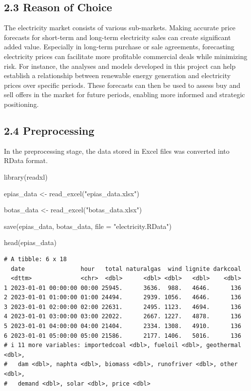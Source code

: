 \documentclass[
]{article}
\newenvironment{Shaded}{\begin{snugshade}}{\end{snugshade}}
\newcommand{\AttributeTok}[1]{\textcolor[rgb]{0.40,0.45,0.13}{#1}}
\newcommand{\FunctionTok}[1]{\textcolor[rgb]{0.28,0.35,0.67}{#1}}
\newcommand{\NormalTok}[1]{\textcolor[rgb]{0.00,0.23,0.31}{#1}}
\newcommand{\OtherTok}[1]{\textcolor[rgb]{0.00,0.23,0.31}{#1}}
\newcommand{\StringTok}[1]{\textcolor[rgb]{0.13,0.47,0.30}{#1}}
\begin{document}
\subsection{2.3 Reason of Choice}\label{reason-of-choice}

The electricity market consists of various sub-markets. Making accurate
price forecasts for short-term and long-term electricity sales can
create significant added value. Especially in long-term purchase or sale
agreements, forecasting electricity prices can facilitate more
profitable commercial deals while minimizing risk. For instance, the
analyses and models developed in this project can help establish a
relationship between renewable energy generation and electricity prices
over specific periods. These forecasts can then be used to assess buy
and sell offers in the market for future periods, enabling more informed
and strategic positioning.

\subsection{2.4 Preprocessing}\label{preprocessing}

In the preprocessing stage, the data stored in Excel files was converted
into RData format.

\begin{Shaded}
\begin{Highlighting}[]
\FunctionTok{library}\NormalTok{(readxl)}

\NormalTok{epias\_data }\OtherTok{\textless{}{-}} \FunctionTok{read\_excel}\NormalTok{(}\StringTok{"epias\_data.xlsx"}\NormalTok{)}

\NormalTok{botas\_data }\OtherTok{\textless{}{-}} \FunctionTok{read\_excel}\NormalTok{(}\StringTok{"botas\_data.xlsx"}\NormalTok{)}

\FunctionTok{save}\NormalTok{(epias\_data, botas\_data, }\AttributeTok{file =} \StringTok{"electricity.RData"}\NormalTok{)}

\FunctionTok{head}\NormalTok{(epias\_data)}
\end{Highlighting}
\end{Shaded}

\begin{verbatim}
# A tibble: 6 x 18
  date                hour   total naturalgas  wind lignite darkcoal
  <dttm>              <chr>  <dbl>      <dbl> <dbl>   <dbl>    <dbl>
1 2023-01-01 00:00:00 00:00 25945.      3636.  988.   4646.      136
2 2023-01-01 01:00:00 01:00 24494.      2939. 1056.   4646.      136
3 2023-01-01 02:00:00 02:00 22631.      2495. 1123.   4694.      136
4 2023-01-01 03:00:00 03:00 22022.      2667. 1227.   4878.      136
5 2023-01-01 04:00:00 04:00 21404.      2334. 1308.   4910.      136
6 2023-01-01 05:00:00 05:00 21586.      2177. 1406.   5016.      136
# i 11 more variables: importedcoal <dbl>, fueloil <dbl>, geothermal <dbl>,
#   dam <dbl>, naphta <dbl>, biomass <dbl>, runofriver <dbl>, other <dbl>,
#   demand <dbl>, solar <dbl>, price <dbl>
\end{verbatim}
\end{document}
